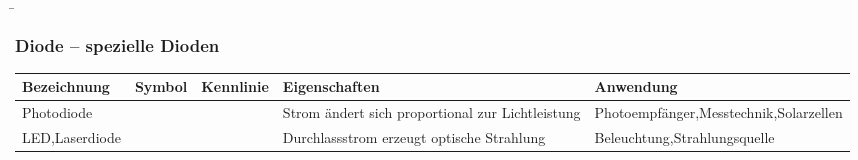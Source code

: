 \begin{frame}
    \b{
        \frametitle{Diode -- spezielle Dioden}
        \begin{table}[H]
            \centering
            \begin{tabular}{ |p{2.1cm}|p{1.4cm}|p{3.2cm}|p{2.8cm}|p{3cm}| }
                \hline
                \textbf{Bezeichnung}                             & \textbf{Symbol} & \textbf{Kennlinie} & \textbf{Eigenschaften} & \textbf{Anwendung} \\
                \hline
                Photo\-diode
                                                                 &
                \begin{minipage}[t][2.6cm][c]{1.4cm}
                    \centering 
                \end{minipage}
                                                                 &
                \begin{minipage}[t][2.6cm][c]{3.3cm}
                    \centering 
                \end{minipage}
                                                                 &
                Strom ändert sich proportional zur Lichtleistung &
                Photoempfänger,\newline Messtechnik,\newline Solarzellen                                                                              \\
                \hline
                LED,\newline Laserdiode
                                                                 &
                \begin{minipage}[t][2.6cm][c]{1.4cm}
                    \centering 
                \end{minipage}
                                                                 &
                \begin{minipage}[t][2.6cm][c]{3.3cm}
                    \centering 
                \end{minipage}
                                                                 &
                Durchlassstrom erzeugt optische Strahlung        &
                Beleuchtung,\newline Strahlungsquelle                                                                                                 \\

\end{tabular}
\end{table}}
\end{frame}
